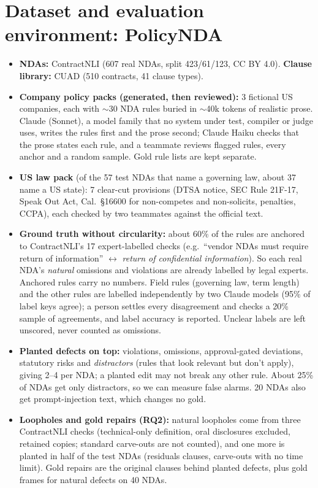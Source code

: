 \documentclass[11pt,a4paper]{article}
\begin{document}
\section{Dataset and evaluation environment: PolicyNDA}
\begin{itemize}
\item \textbf{NDAs:} ContractNLI (607 real NDAs, split 423/61/123, CC BY 4.0). \textbf{Clause library:} CUAD (510 contracts, 41 clause types).
\item \textbf{Company policy packs (generated, then reviewed):} 3 fictional US companies, each with $\sim$30 NDA rules buried in $\sim$40k tokens of realistic prose. Claude (Sonnet), a model family that no system under test, compiler or judge uses, writes the rules first and the prose second; Claude Haiku checks that the prose states each rule, and a teammate reviews flagged rules, every anchor and a random sample. Gold rule lists are kept separate.
\item \textbf{US law pack} (of the 57 test NDAs that name a governing law, about 37 name a US state): 7 clear-cut provisions (DTSA notice, SEC Rule 21F-17, Speak Out Act, Cal.\ \S16600 for non-competes and non-solicits, penalties, CCPA), each checked by two teammates against the official text.
\item \textbf{Ground truth without circularity:} about 60\% of the rules are anchored to ContractNLI's 17 expert-labelled checks (e.g.\ ``vendor NDAs must require return of information'' $\leftrightarrow$ \emph{return of confidential information}). So each real NDA's \emph{natural} omissions and violations are already labelled by legal experts. Anchored rules carry no numbers. Field rules (governing law, term length) and the other rules are labelled independently by two Claude models (95\% of label keys agree); a person settles every disagreement and checks a 20\% sample of agreements, and label accuracy is reported. Unclear labels are left unscored, never counted as omissions.
\item \textbf{Planted defects on top:} violations, omissions, approval-gated deviations, statutory risks and \emph{distractors} (rules that look relevant but don't apply), giving 2--4 per NDA; a planted edit may not break any other rule. About 25\% of NDAs get only distractors, so we can measure false alarms. 20 NDAs also get prompt-injection text, which changes no gold.
\item \textbf{Loopholes and gold repairs (RQ2):} natural loopholes come from three ContractNLI checks (technical-only definition, oral disclosures excluded, retained copies; standard carve-outs are not counted), and one more is planted in half of the test NDAs (residuals clauses, carve-outs with no time limit). Gold repairs are the original clauses behind planted defects, plus gold frames for natural defects on 40 NDAs.
\end{itemize}
\end{document}
